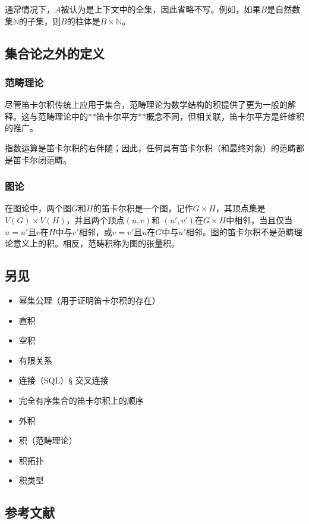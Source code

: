 通常情况下，\( A \)被认为是上下文中的全集，因此省略不写。例如，如果\( B \)是自然数集\( \mathbb{N} \)的子集，则\( B \)的柱体是\( B \times \mathbb{N} \)。
\subsection{集合论之外的定义}
\subsubsection{范畴理论}  
尽管笛卡尔积传统上应用于集合，范畴理论为数学结构的积提供了更为一般的解释。这与范畴理论中的**笛卡尔平方**概念不同，但相关联，笛卡尔平方是纤维积的推广。

指数运算是笛卡尔积的右伴随；因此，任何具有笛卡尔积（和最终对象）的范畴都是笛卡尔闭范畴。
\subsubsection{图论} 
在图论中，两个图\( G \)和\( H \)的笛卡尔积是一个图，记作\( G \times H \)，其顶点集是\( V(G) \times V(H) \)，并且两个顶点\( (u, v) \)和 \( (u', v') \)在\( G \times H \)中相邻，当且仅当\( u = u' \)且\( v \)在\( H \)中与\( v' \)相邻，或\( v = v' \)且\( u \)在\( G \)中与\( u' \)相邻。图的笛卡尔积不是范畴理论意义上的积。相反，范畴积称为图的张量积。
\subsection{另见}
\begin{itemize}
\item 幂集公理（用于证明笛卡尔积的存在）
\item 直积
\item 空积
\item 有限关系
\item 连接（SQL）§ 交叉连接
\item 完全有序集合的笛卡尔积上的顺序
\item 外积
\item 积（范畴理论）
\item 积拓扑
\item 积类型
\end{itemize}
\subsection{参考文献}

